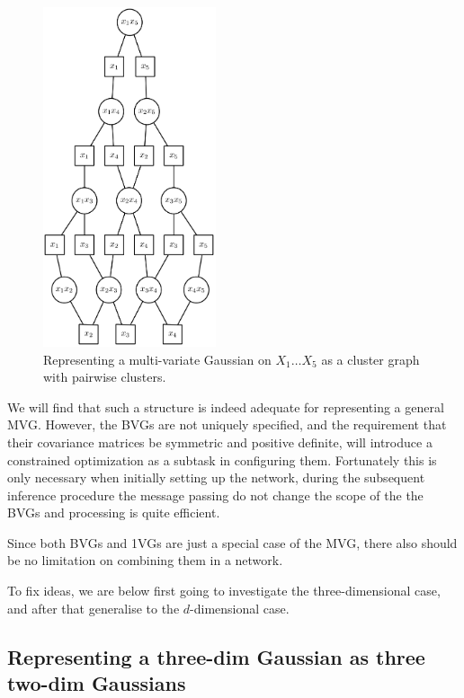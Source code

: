 \begin{figure}
\noindent \begin{centering}
\includegraphics[height=10cm]{gaussian_pairs}
\par\end{centering}

\caption{Representing a multi-variate Gaussian on $X_{1}\hdots X_{5}$ as a
cluster graph with pairwise clusters.}
\label{fig:gaussianpairs_cg}
\end{figure}


We will find that such a structure is indeed adequate for representing
a general MVG. However, the BVGs are not uniquely specified, and the
requirement that their covariance matrices be symmetric and positive
definite, will introduce a constrained optimization as a subtask in
configuring them. Fortunately this is only necessary when initially
setting up the network, during the subsequent inference procedure
the message passing do not change the scope of the the BVGs and processing
is quite efficient.

Since both BVGs and 1VGs are just a special case of the MVG, there
also should be no limitation on combining them in a network.

To fix ideas, we are below first going to investigate the three-dimensional
case, and after that generalise to the $d$-dimensional case.


\subsection{Representing a three-dim Gaussian as three two-dim Gaussians \label{sub:Representing-a-three-dim}}


